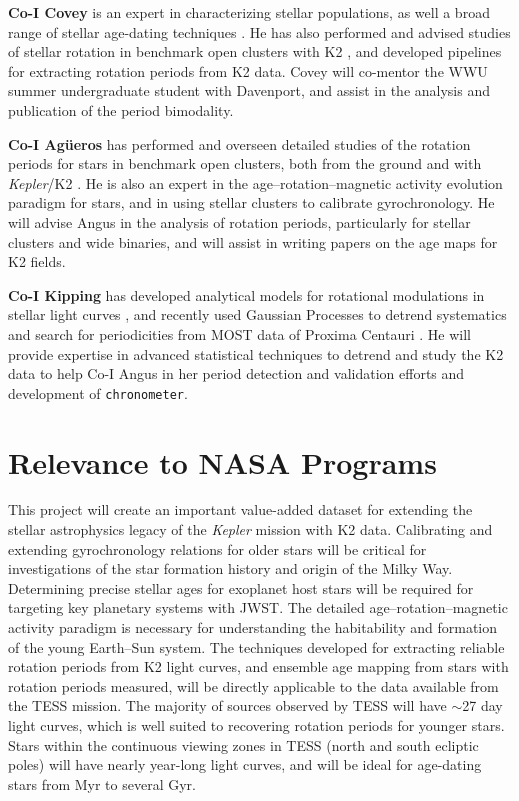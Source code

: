 \documentclass[12pt]{article}
\newcommand{\Kepler}{\textsl{Kepler}\xspace}
\begin{document}
{\bf Co-I Covey} is an expert in characterizing stellar populations, as well a broad range of stellar age-dating techniques \citep{covey2010white}. He has also performed and advised studies of stellar rotation in benchmark open clusters with K2 \citep{douglas2016,covey2016}, and developed pipelines for extracting rotation periods from K2 data. Covey will co-mentor the WWU summer undergraduate student with Davenport, and assist in the analysis and publication of the period bimodality.

{\bf Co-I Ag\"{u}eros} has performed and overseen detailed studies of the rotation periods for stars in benchmark open clusters, both from the ground \citep{agueros2011} and with \Kepler/K2 \citep{douglas2016,douglas2017,nunez2017}. He is also an expert in the age--rotation--magnetic activity evolution paradigm for stars, and in using stellar clusters to calibrate gyrochronology. He will advise Angus in the analysis of rotation periods, particularly for stellar clusters and wide binaries, and will assist in writing papers on the age maps for K2 fields.

{\bf Co-I Kipping}
has developed analytical models for rotational modulations in stellar light curves \citep{kipping2012}, and recently used Gaussian Processes to detrend systematics and search for periodicities from MOST data of Proxima Centauri \citep{kippingmost}. He will provide expertise in advanced statistical techniques to detrend and study the K2 data to help Co-I Angus in her period detection and validation efforts and development of {\tt chronometer}.




\section{Relevance to NASA Programs}
This project will create an important value-added dataset for extending the stellar astrophysics legacy of the \Kepler mission with K2 data.
Calibrating and extending gyrochronology relations for older stars will be critical for  investigations of the star formation history and origin of the Milky Way. Determining precise stellar ages for exoplanet host stars will be required for targeting key planetary systems with JWST. The detailed age--rotation--magnetic activity paradigm is necessary for understanding the habitability and formation of the young Earth--Sun system. The techniques developed for extracting reliable rotation periods from K2 light curves, and ensemble age mapping from stars with rotation periods measured, will be directly applicable to the data available from the TESS mission. The majority of sources observed by TESS will have $\sim$27 day light curves, which is well suited to recovering rotation periods for younger stars. Stars within the continuous viewing zones in TESS (north and south ecliptic poles) will have nearly year-long light curves, and will be ideal for age-dating stars from Myr to several Gyr.
\end{document}
